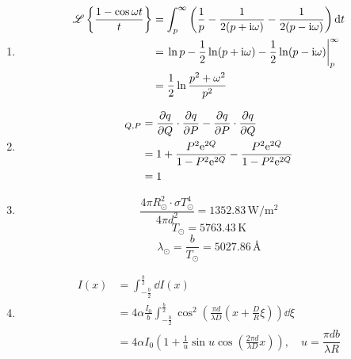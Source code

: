 \documentclass[a4paper]{article}
\begin{document}
\begin{enumerate}
        \item
        \begin{align*}
            \mathscr{L}\left\lbrace\frac{1-\cos\omega t}{t}\right\rbrace
            &=\int_{p}^{\infty} \left(\frac{1}{p}-\frac{1}{2(p+\mathrm{i}\omega)}-\frac{1}{2(p-\mathrm{i}\omega)}\right) \dd{t} \\
            &=\eval{\ln p-\frac{1}{2}\ln(p+\mathrm{i}\omega)-\frac{1}{2}\ln(p-\mathrm{i}\omega)}_{p}^{\infty} \\
            &=\frac{1}{2}\ln\frac{p^2+\omega^2}{p^2}
        \end{align*}

        \item
        \begin{align*}
            [q,p]_{Q,P}
            &= \pdv{q}{Q} \cdot \pdv{q}{P} - \pdv{q}{P} \cdot \pdv{q}{Q} \\
            &= 1 + \frac{P^2\mathrm{e}^{2Q}}{1-P^2\mathrm{e}^{2Q}} - \frac{P^2\mathrm{e}^{2Q}}{1-P^2\mathrm{e}^{2Q}} \\
            &= 1
        \end{align*}

        \item
        \[
        \frac{4\pi R_{\odot}^2 \cdot \sigma T_{\odot}^4}{4\pi d^2} = 1352.83\,\mathrm{W/m^2}
        \]
        \[
        T_{\odot} = 5763.43\,\mathrm{K}
        \]
        \[
        \lambda_{\odot} = \frac{b}{T_{\odot}} = 5027.86\,\text{\AA}
        \]

        \item
        \begin{align*}
            I(x)
            &= \int_{-\tfrac{b}{2}}^{\tfrac{b}{2}} \dd{I(x)} \\
            &= 4\alpha\frac{I_0}{b}\int_{-\tfrac{b}{2}}^{\tfrac{b}{2}}\cos^2\left(\frac{\pi d}{\lambda D}\left(x+\frac{D}{R}\xi\right)\right) \dd{\xi} \\
            &= 4\alpha I_0\left(1+\frac{1}{u}\sin u\cos\left(\frac{2\pi d}{\lambda D}x\right)\right),\quad u = \dfrac{\pi db}{\lambda R}
        \end{align*}

    \end{enumerate}
\end{document}
